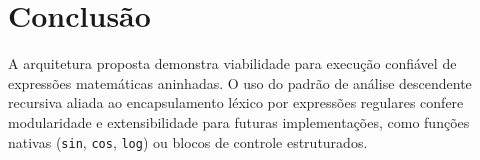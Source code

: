 \documentclass[12pt,a4paper]{article}
\begin{document}
\section{Conclusão}
A arquitetura proposta demonstra viabilidade para execução confiável de expressões matemáticas aninhadas. O uso do padrão de análise descendente recursiva aliada ao encapsulamento léxico por expressões regulares confere modularidade e extensibilidade para futuras implementações, como funções nativas (\texttt{sin}, \texttt{cos}, \texttt{log}) ou blocos de controle estruturados.
\end{document}
